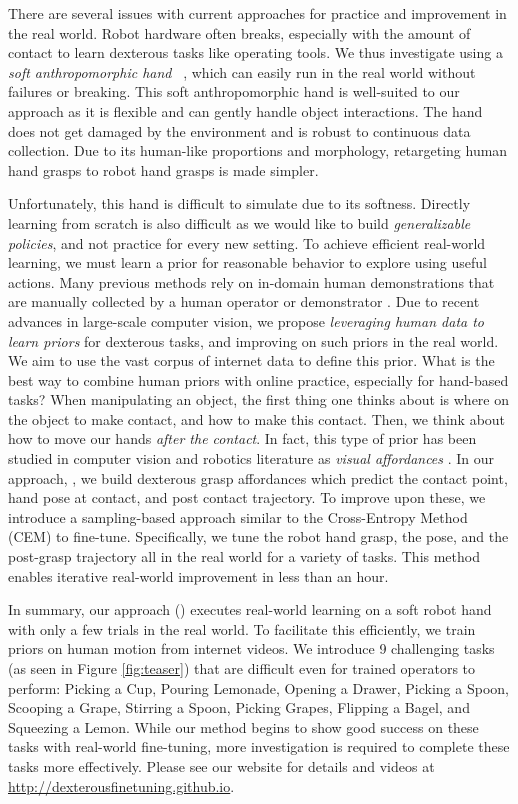 There are several issues with current approaches for practice and improvement in the real world. Robot hardware often breaks, especially with the amount of contact to learn dexterous tasks like operating tools. We thus investigate using a \textit{soft anthropomorphic hand} ~\cite{mannam2023framework}, which can easily run in the real world without failures or breaking. This soft anthropomorphic hand is well-suited to our approach as it is flexible and can gently handle object interactions. The hand does not get damaged by the environment and is robust to continuous data collection. Due to its human-like proportions and morphology, retargeting human hand grasps to robot hand grasps is made simpler.  

Unfortunately, this hand is difficult to simulate due to its softness. Directly learning from scratch is also difficult as we would like to build \textit{generalizable policies}, and not practice for every new setting.  To achieve efficient real-world learning, we must learn a prior for reasonable behavior to explore using useful actions.  Many previous methods rely on in-domain human demonstrations that are manually collected by a human operator or demonstrator \cite{shaw2022video, zhao2023learning, pomerleau1988alvinn, mandlekar2021matters}. Due to recent advances in large-scale computer vision, we propose \textit{leveraging human data to learn priors} for dexterous tasks, and improving on such priors in the real world. We aim to use the vast corpus of internet data to define this prior. What is the best way to combine human priors with online practice, especially for hand-based tasks? When manipulating an object, the first thing one thinks about is where on the object to make contact, and how to make this contact. Then, we think about how to move our hands \textit{after the contact}. In fact, this type of prior has been studied in computer vision and robotics literature as \textit{visual affordances} \cite{fouhey2015defense, bahl2023affordances, hap, hotspots, 100doh, hoi, hoi4d, wang2017binge}. In our approach, \ours, we build dexterous grasp affordances which predict the contact point, hand pose at contact, and post contact trajectory. To improve upon these, we introduce a sampling-based approach similar to the Cross-Entropy Method (CEM) to fine-tune. Specifically, we tune the robot hand grasp, the pose, and the post-grasp trajectory all in the real world for a variety of tasks.  This method enables iterative real-world improvement in less than an hour. 

In summary, our approach (\ours) executes real-world learning on a soft robot hand with only a few trials in the real world.  To facilitate this efficiently, we train priors on human motion from internet videos. We introduce 9 challenging tasks (as seen in Figure \ref{fig:teaser}) that are difficult even for trained operators to perform: Picking a Cup, Pouring Lemonade, Opening a Drawer, Picking a Spoon, Scooping a Grape, Stirring a Spoon, Picking Grapes, Flipping a Bagel, and Squeezing a Lemon.  While our method begins to show good success on these tasks with real-world fine-tuning, more investigation is required to complete these tasks more effectively. Please see our website for details and videos at \url{http://dexterousfinetuning.github.io}.
